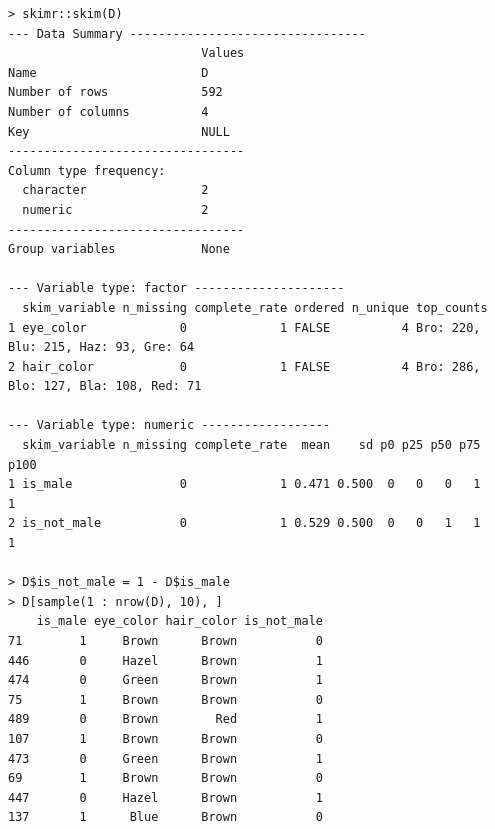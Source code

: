 \documentclass[12pt]{article}
\begin{document}
\begin{lstlisting}
> skimr::skim(D)
--- Data Summary ---------------------------------  
                           Values
Name                       D     
Number of rows             592   
Number of columns          4     
Key                        NULL  
---------------------------------           
Column type frequency:           
  character                2     
  numeric                  2     
---------------------------------         
Group variables            None  

--- Variable type: factor ---------------------
  skim_variable n_missing complete_rate ordered n_unique top_counts                           
1 eye_color             0             1 FALSE          4 Bro: 220, Blu: 215, Haz: 93, Gre: 64 
2 hair_color            0             1 FALSE          4 Bro: 286, Blo: 127, Bla: 108, Red: 71

--- Variable type: numeric ------------------
  skim_variable n_missing complete_rate  mean    sd p0 p25 p50 p75 p100 
1 is_male               0             1 0.471 0.500  0   0   0   1    1 
2 is_not_male           0             1 0.529 0.500  0   0   1   1    1 

> D$is_not_male = 1 - D$is_male
> D[sample(1 : nrow(D), 10), ]
    is_male eye_color hair_color is_not_male
71        1     Brown      Brown           0
446       0     Hazel      Brown           1
474       0     Green      Brown           1
75        1     Brown      Brown           0
489       0     Brown        Red           1
107       1     Brown      Brown           0
473       0     Green      Brown           1
69        1     Brown      Brown           0
447       0     Hazel      Brown           1
137       1      Blue      Brown           0
\end{lstlisting}
\end{document}
